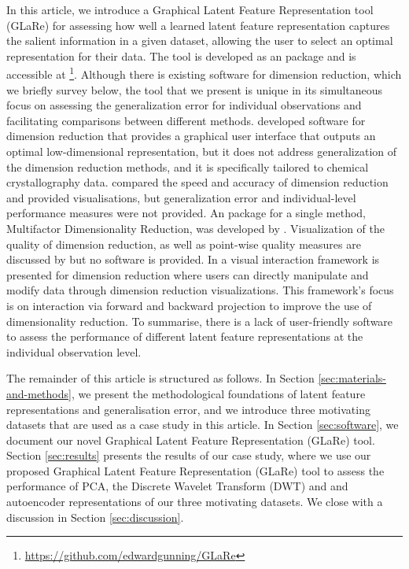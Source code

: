 In this article, we introduce a Graphical Latent Feature Representation tool (GLaRe) for assessing how well a learned latent feature representation captures the salient information in a given dataset, allowing the user to select an optimal representation for their data.
The tool is developed as an  \parencite{r_core_team_r_2022} package and is accessible at \footnote{\url{https://github.com/edwardgunning/GLaRe}}. 
Although there is existing software for dimension reduction, which we briefly survey below, the tool that we present is unique in its simultaneous focus on assessing the generalization error for individual observations and facilitating comparisons between different methods.
\textcite{samudrala_software_2014} developed software for dimension reduction that provides a graphical user interface that outputs an optimal low-dimensional representation, but it does not address generalization of the dimension reduction methods, and it is specifically tailored to chemical crystallography data.
\textcite{zubova_dimensionality_2018} compared the speed and accuracy of dimension reduction and provided visualisations, but generalization error and individual-level performance measures were not provided. 
An  package for a single method, Multifactor Dimensionality Reduction, was developed by \textcite{winham_r_2011}. Visualization of the quality of dimension reduction, as well as point-wise quality measures are discussed by \textcite{mokbel_visualizing_2013} but no software is provided. 
In \textcite{cavallo_visual_2018} a visual interaction framework is presented for dimension reduction where users can directly manipulate and modify data through dimension reduction visualizations. This framework's focus is on interaction via forward and backward projection to improve the use of dimensionality
reduction.
To summarise, there is a lack of user-friendly software to assess the performance of different latent feature representations at the individual observation level.

The remainder of this article is structured as follows.
In Section \ref{sec:materials-and-methods}, we present the methodological foundations of latent feature representations and generalisation error, and we introduce three motivating datasets that are used as a case study in this article. 
In Section \ref{sec:software}, we document our novel Graphical Latent Feature Representation (GLaRe) tool.
Section \ref{sec:results} presents the results of our case study, where we use our proposed Graphical Latent Feature Representation (GLaRe) tool to assess the performance of PCA, the Discrete Wavelet Transform (DWT) and and autoencoder representations of our three motivating datasets.
We close with a discussion in Section \ref{sec:discussion}.

